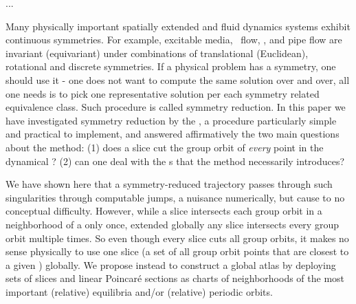 

\ifboyscout
	...
\fi

Many physically important spatially extended and fluid dynamics systems
exhibit continuous symmetries. For example,  excitable
media, \KS\
flow, {\pCf}, and
pipe flow\rf{Wk04,Kerswell05} are invariant (equivariant) under
combinations of translational (Euclidean), rotational and discrete
symmetries. If a physical problem has a symmetry, one should use it - one
does not want to compute the same solution over and over, all one needs
is to pick one representative solution per each symmetry related
equivalence class. Such procedure is called symmetry reduction.  In this
paper we have investigated symmetry reduction by the \mslices, a
procedure particularly simple and practical to implement, and answered
affirmatively the two main questions about the method:
(1) does a slice cut the group orbit of \emph{every} point in the
dynamical \statesp?
(2) can one deal with the {\sset s} that the method necessarily
introduces?

We have shown here that a symmetry-reduced trajectory passes through such
singularities through computable jumps, a nuisance numerically, but cause
to no conceptual difficulty. However, while a slice intersects each group
orbit in a neighborhood of a {\template} only once, extended globally any
slice intersects every group orbit multiple times. So even though every
slice cuts all group orbits, it makes no sense physically to use one
slice (a set of all group orbit points that are closest to a given
{\template}) globally. We propose instead to construct a global atlas by
deploying sets of slices and linear Poincar\'e sections as charts of
neighborhoods of the most important (relative) equilibria and/or
(relative) periodic orbits.

